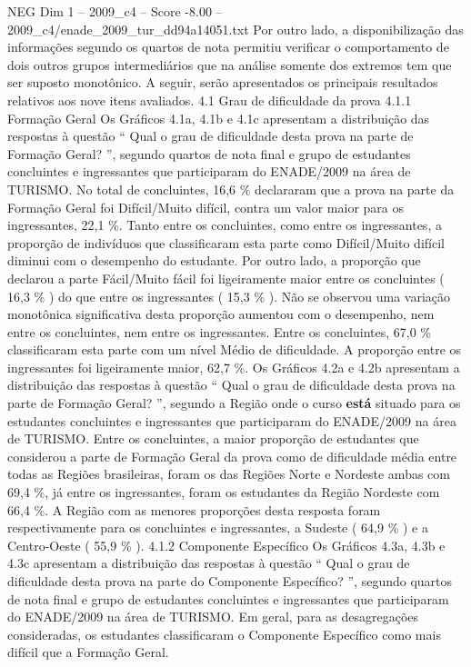 \begin{textsample}{NEG Dim 1 – 2009\_c4 – Score -8.00 – 2009\_c4/enade\_2009\_tur\_dd94a14051.txt}
Por outro lado, a disponibilização das informações segundo os quartos de nota permitiu verificar o comportamento de dois outros grupos intermediários que na análise somente dos extremos tem que ser suposto monotônico.
A seguir, serão apresentados os principais resultados relativos aos nove itens avaliados. 4.1 Grau de dificuldade da prova 4.1.1 Formação Geral Os Gráficos 4.1a, 4.1b e 4.1c apresentam a distribuição das respostas à questão “ Qual o grau de dificuldade desta prova na parte de Formação Geral? ”, segundo quartos de nota final e grupo de estudantes concluintes e ingressantes que participaram do ENADE/2009 na área de TURISMO.
No total de concluintes, 16,6 \% declararam que a prova na parte da Formação Geral foi Difícil/Muito difícil, contra um valor maior para os ingressantes, 22,1 \%.
Tanto entre os concluintes, como entre os ingressantes, a proporção de indivíduos que classificaram esta parte como Difícil/Muito difícil diminui com o desempenho do estudante.
Por outro lado, a proporção que declarou a parte Fácil/Muito fácil foi ligeiramente maior entre os concluintes ( 16,3 \% ) do que entre os ingressantes ( 15,3 \% ).
Não se observou uma variação monotônica significativa desta proporção aumentou com o desempenho, nem entre os concluintes, nem entre os ingressantes.
Entre os concluintes, 67,0 \% classificaram esta parte com um nível Médio de dificuldade.
A proporção entre os ingressantes foi ligeiramente maior, 62,7 \%.
Os Gráficos 4.2a e 4.2b apresentam a distribuição das respostas à questão “ Qual o grau de dificuldade desta prova na parte de Formação Geral? ”, segundo a Região onde o curso \textbf{está} situado para os estudantes concluintes e ingressantes que participaram do ENADE/2009 na área de TURISMO.
Entre os concluintes, a maior proporção de estudantes que considerou a parte de Formação Geral da prova como de dificuldade média entre todas as Regiões brasileiras, foram os das Regiões Norte e Nordeste ambas com 69,4 \%, já entre os ingressantes, foram os estudantes da Região Nordeste com 66,4 \%.
A Região com as menores proporções desta resposta foram respectivamente para os concluintes e ingressantes, a Sudeste ( 64,9 \% ) e a Centro-Oeste ( 55,9 \% ). 4.1.2 Componente Específico Os Gráficos 4.3a, 4.3b e 4.3c apresentam a distribuição das respostas à questão “ Qual o grau de dificuldade desta prova na parte do Componente Específico? ”, segundo quartos de nota final e grupo de estudantes concluintes e ingressantes que participaram do ENADE/2009 na área de TURISMO.
Em geral, para as desagregações consideradas, os estudantes classificaram o Componente Específico como mais difícil que a Formação Geral.

\end{textsample}
